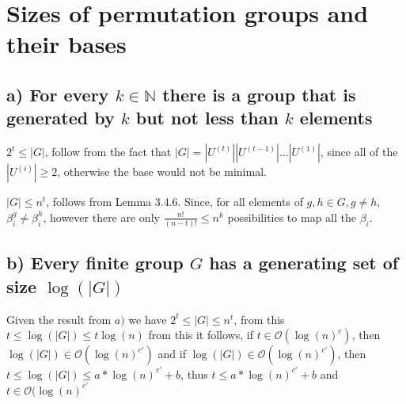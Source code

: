 \section{Sizes of permutation groups and their bases}

\subsection*{a) For every $k \in \mathds{N}$ there is a group that is generated by $k$ but not less than $k$ elements}

$2^t \leq |G|$, follow from the fact that $|G|=|U^{(t)}||U^{(t-1)}|\dots|U^{(1)}|$, since all of the $|U^(i)| \geq 2$, otherwise the base would not be minimal.

$|G| \leq n^t$, follows from Lemma 3.4.6. Since, for all elements of $g,h \in G, g \neq h$, $\beta_i^g \neq \beta_i^h$, however there are only $\frac{n!}{(n-t)!} \leq n^k$ possibilities to map all the $\beta_i$.

\subsection*{b) Every finite group $G$ has a generating set of size $\log(|G|)$}

Given the result from $a)$ we have $2^t \leq |G| \leq n^t$, from this $t \leq \log(|G|) \leq t \log(n)$ from this it follows, if $t \in \mathcal{O}(\log(n)^c)$, then $\log(|G|) \in \mathcal{O}(\log(n)^{c'})$ and 
if $\log(|G|) \in \mathcal{O}(\log(n)^{c'})$, then $t \leq \log(|G|) \leq a*\log(n)^{c'}+b$, thus $t \leq a*\log(n)^{c'}+b$ and $t \in \mathcal{O}(\log(n)^{c'}$